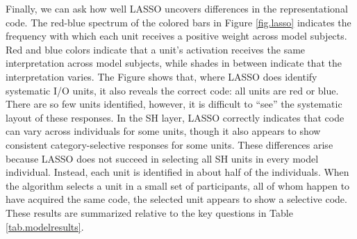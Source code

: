 Finally, we can ask how well LASSO uncovers differences in the representational code. The red-blue spectrum of the colored bars in Figure \ref{fig.lasso} indicates the frequency with which each unit receives a positive weight across model subjects. Red and blue colors indicate that a unit's activation receives the same interpretation across model subjects, while shades in between indicate that the interpretation varies. The Figure shows that, where LASSO does identify systematic I/O units, it also reveals the correct code: all units are red or blue. There are so few units identified, however, it is difficult to ``see'' the systematic layout of these responses. In the SH layer, LASSO correctly indicates that code can vary across individuals for some units, though it also appears to show consistent category-selective responses for some units. These differences arise because LASSO does not succeed in selecting all SH units in every model individual. Instead, each unit is identified in about half of the individuals. When the algorithm selects a unit in a small set of participants, all of whom happen to have acquired the same code, the selected unit appears to show a selective code. These results are summarized relative to the key questions in Table \ref{tab.modelresults}.



